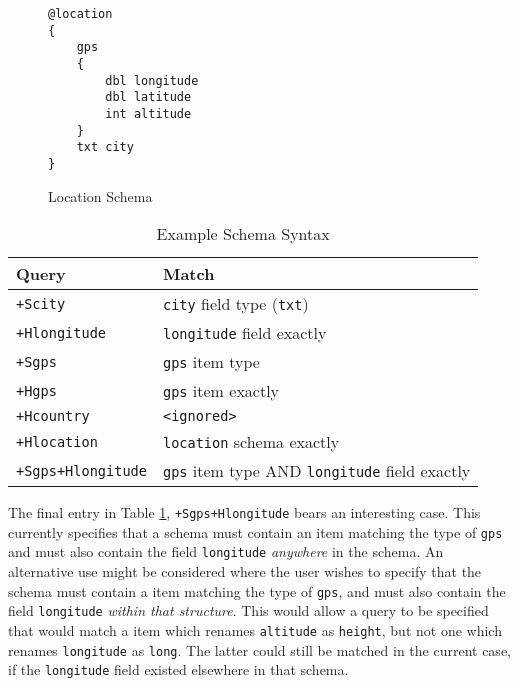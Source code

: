 \documentclass[12pt,twoside,notitlepage]{report}
\begin{document}
\begin{figure}[tbh]
\begin{lstlisting}
@location
{
	gps
	{
		dbl longitude
		dbl latitude
		int altitude
	}
	txt city
}
\end{lstlisting}
\caption{Location Schema}
\label{fig:locationschema}
\end{figure}

\begin{table}[tbh]
\centering

\begin{tabular}{l l}
\hline\hline
Query & Match \\
\hline

{\tt +Scity}		& {\tt city} field type ({\tt txt}) \\
{\tt +Hlongitude}	& {\tt longitude} field exactly \\

{\tt +Sgps}			& {\tt gps} item type \\
{\tt +Hgps}			& {\tt gps} item exactly \\

{\tt +Hcountry}		& {\tt <ignored>} \\
{\tt +Hlocation}	& {\tt location} schema exactly \\

{\tt +Sgps+Hlongitude}	& {\tt gps} item type AND {\tt longitude} field exactly \\

\hline
\end{tabular}

\caption{Example Schema Syntax}
\label{tab:example_schema_syntax}
\end{table}

The final entry in Table \ref{tab:example_schema_syntax}, {\tt +Sgps+Hlongitude} bears an interesting case. 
This currently specifies that a schema must contain an item matching the type of {\tt gps} and must also contain the field {\tt longitude} {\sl anywhere} in the schema. 
An alternative use might be considered where the user wishes to specify that the schema must contain a item matching the type of {\tt gps}, and must also contain the field {\tt longitude} {\sl within that structure}. 
This would allow a query to be specified that would match a item which renames {\tt altitude} as {\tt height}, but not one which renames {\tt longitude} as {\tt long}. 
The latter could still be matched in the current case, if the {\tt longitude} field existed elsewhere in that schema. 
\end{document}
